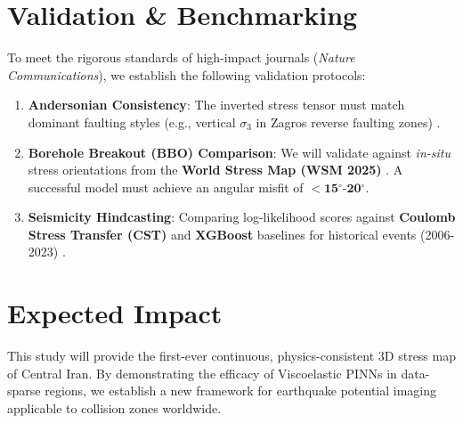 \documentclass[11pt, a4paper]{article}
\begin{document}
\section{Validation \& Benchmarking}
To meet the rigorous standards of high-impact journals (\textit{Nature Communications}), we establish the following validation protocols:
\begin{enumerate}
    \item \textbf{Andersonian Consistency}: The inverted stress tensor must match dominant faulting styles (e.g., vertical $\sigma_3$ in Zagros reverse faulting zones) \cite{Anderson1951}.
    \item \textbf{Borehole Breakout (BBO) Comparison}: We will validate against \textit{in-situ} stress orientations from the \textbf{World Stress Map (WSM 2025)} \cite{Heidbach2018}. A successful model must achieve an angular misfit of $< \textbf{15$^\circ$-20$^\circ$}$.
    \item \textbf{Seismicity Hindcasting}: Comparing log-likelihood scores against \textbf{Coulomb Stress Transfer (CST)} and \textbf{XGBoost} baselines for historical events (2006-2023) \cite{GCMT}.
\end{enumerate}

\section{Expected Impact}
This study will provide the first-ever continuous, physics-consistent 3D stress map of Central Iran. By demonstrating the efficacy of Viscoelastic PINNs in data-sparse regions, we establish a new framework for earthquake potential imaging applicable to collision zones worldwide.
\end{document}
